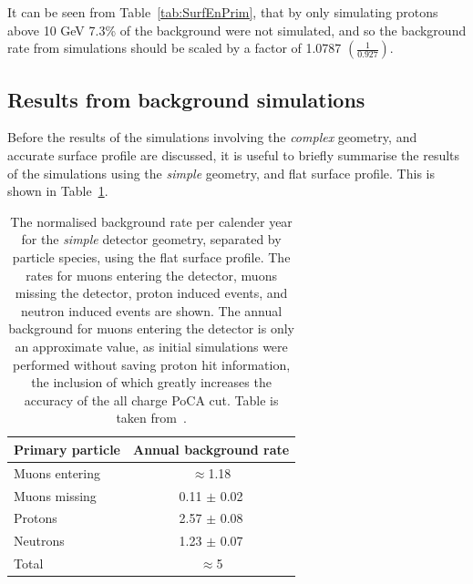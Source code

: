 It can be seen from Table~\ref{tab:SurfEnPrim}, that by only simulating protons above 10 GeV 7.3\% of the background were not simulated, and so the background rate from simulations should be scaled by a factor of 1.0787 $\left(\frac{1}{0.927}\right)$. \\

\subsection{Results from background simulations}
Before the results of the simulations involving the \emph{complex} geometry, and accurate surface profile are discussed, it is useful to briefly summarise the results of the simulations using the \emph{simple} geometry, and flat surface profile. This is shown in Table~\ref{tab:SimpSurfRates}. \\
\begin{table}
  \caption[The normalised background rate per calender year for the \emph{simple} detector geometry, using the flat surface profile]
          {The normalised background rate per calender year for the \emph{simple} detector geometry, separated by particle species, using the flat surface profile. The rates for muons entering the detector, muons missing the detector, proton induced events, and neutron induced events are shown. The annual background for muons entering the detector is only an approximate value, as initial simulations were performed without saving proton hit information, the inclusion of which greatly increases the accuracy of the all charge PoCA cut. Table is taken from~\citep{MartinsThesis}.}
  \centering
  \label{tab:SimpSurfRates}
  \begin{tabular}{l c}
    \toprule
        {Primary particle} & {Annual background rate}  \\ 
        \midrule
        Muons entering     & $\approx$1.18             \\

        Muons missing      & 0.11 $\pm$ 0.02           \\

        Protons            & 2.57 $\pm$ 0.08           \\

        Neutrons           & 1.23 $\pm$ 0.07           \\

        Total              & $\approx$5                \\
    \bottomrule
  \end{tabular}
\end{table}

